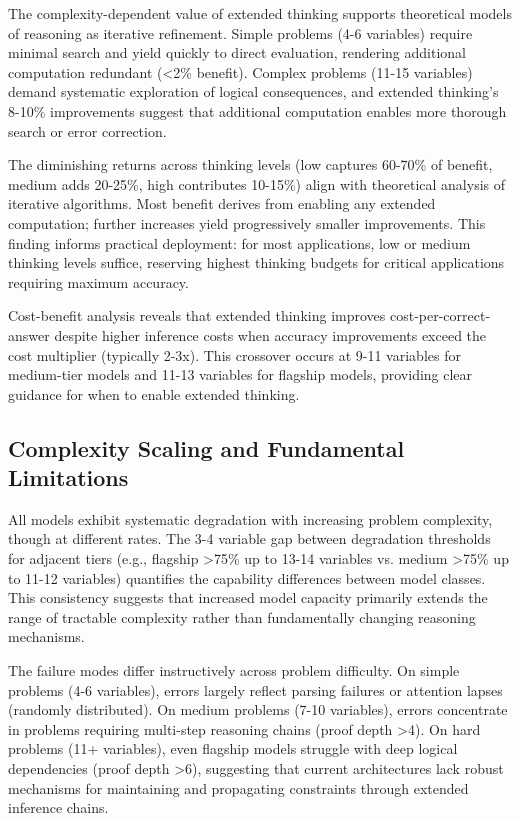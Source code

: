 \documentclass[pdflatex,sn-mathphys-num]{sn-jnl}%
\theoremstyle{thmstyleone}%
\theoremstyle{thmstyletwo}%
\theoremstyle{thmstylethree}%
\begin{document}
The complexity-dependent value of extended thinking supports theoretical models of reasoning as iterative refinement. Simple problems (4-6 variables) require minimal search and yield quickly to direct evaluation, rendering additional computation redundant (<2\% benefit). Complex problems (11-15 variables) demand systematic exploration of logical consequences, and extended thinking's 8-10\% improvements suggest that additional computation enables more thorough search or error correction.

The diminishing returns across thinking levels (low captures 60-70\% of benefit, medium adds 20-25\%, high contributes 10-15\%) align with theoretical analysis of iterative algorithms. Most benefit derives from enabling any extended computation; further increases yield progressively smaller improvements. This finding informs practical deployment: for most applications, low or medium thinking levels suffice, reserving highest thinking budgets for critical applications requiring maximum accuracy.

Cost-benefit analysis reveals that extended thinking improves cost-per-correct-answer despite higher inference costs when accuracy improvements exceed the cost multiplier (typically 2-3x). This crossover occurs at 9-11 variables for medium-tier models and 11-13 variables for flagship models, providing clear guidance for when to enable extended thinking.

\subsection{Complexity Scaling and Fundamental Limitations}\label{subsec:disc-limits}

All models exhibit systematic degradation with increasing problem complexity, though at different rates. The 3-4 variable gap between degradation thresholds for adjacent tiers (e.g., flagship >75\% up to 13-14 variables vs. medium >75\% up to 11-12 variables) quantifies the capability differences between model classes. This consistency suggests that increased model capacity primarily extends the range of tractable complexity rather than fundamentally changing reasoning mechanisms.

The failure modes differ instructively across problem difficulty. On simple problems (4-6 variables), errors largely reflect parsing failures or attention lapses (randomly distributed). On medium problems (7-10 variables), errors concentrate in problems requiring multi-step reasoning chains (proof depth >4). On hard problems (11+ variables), even flagship models struggle with deep logical dependencies (proof depth >6), suggesting that current architectures lack robust mechanisms for maintaining and propagating constraints through extended inference chains.
\end{document}
